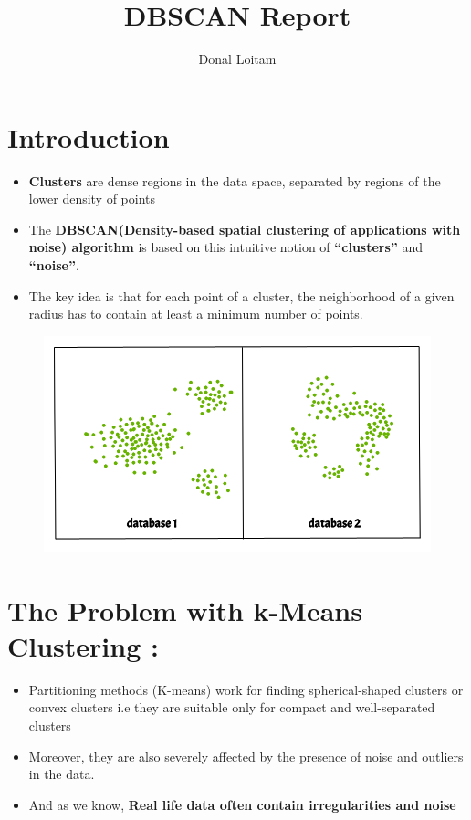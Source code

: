 \documentclass[a4paper, 11pt]{article}
\title{DBSCAN Report}
\author{Donal Loitam}
\begin{document}
\maketitle
\tableofcontents

\section{Introduction}
\begin{itemize}
    \item \textbf{Clusters} are dense regions in the data space, separated by regions of the lower density of points
    \item  The \textbf{DBSCAN(Density-based spatial clustering of applications with noise) algorithm} is based on this intuitive notion of \textbf{“clusters”} and \textbf{“noise”}.
    \item The key idea is that for each point of a cluster, the neighborhood of a given radius has to contain at least a minimum number of points. 
\end{itemize}
\begin{figure}[h!]
    \centering
    \includegraphics[width=0.45\linewidth]{d1.png}
    \label{fig:fig1}
  \end{figure}

\section{The Problem with k-Means Clustering :}
\begin{itemize}
    \item Partitioning methods (K-means) work for finding spherical-shaped clusters or convex clusters i.e they are suitable only for compact and well-separated clusters
    \item Moreover, they are also severely affected by the presence of noise and outliers in the data.
    \item And as we know, \textbf{Real life data often contain irregularities and noise}
\end{itemize}
\end{document}
